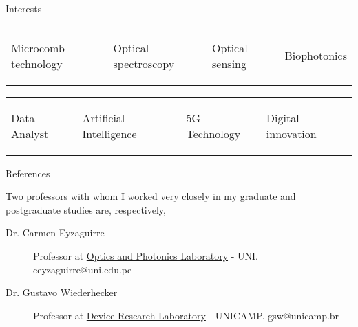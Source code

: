 \documentclass[letterpaper, 11pt]{article}[leftmargin=*]
\renewcommand{\section}[2]{
  \colorbox{boxcol}{\color{secondary}\raggedbottom\normalsize{#1}{\hspace{2pt}#2}}
}
\newcommand{\resumeEntryStart}{\begin{itemize}[leftmargin=2.5mm]\itemsep8pt}
\newcommand{\resumeEntryEnd}{\end{itemize}}
\newcommand{\resumeEntryS}[2]{
  \item[]\small{
    \textbf{\color{primary}#1 }{ #2 }
  }
}
\newcommand{\fourthcol}[4]{
	\vspace{-0.3cm}
	\begin{tabularx}{\textwidth}{XXXX}
		{\small#1} & {\small#2} & {\small#3} & {\small#4}
	\end{tabularx}
}
\begin{document}
\section{\faThumbTack}{Interests}
\vspace{-0.6cm}
\resumeEntryStart
\footnotesize
\fourthcol{\resumeEntryS{}{\item \footnotesize Microcomb technology}}{\resumeEntryS{}{\item \footnotesize Optical spectroscopy}}{\resumeEntryS{}{\item \footnotesize Optical sensing}}{\resumeEntryS{}{\item \footnotesize Biophotonics}}
\vspace{-0.7cm}
\fourthcol{\resumeEntryS{}{\item \footnotesize Data Analyst}}{\resumeEntryS{}{\item \footnotesize Artificial Intelligence}}{\resumeEntryS{}{\item \footnotesize 5G Technology}}{\resumeEntryS{}{\item \footnotesize Digital innovation}}
\resumeEntryEnd

\section{\faTripadvisor}{References}

\footnotesize
\vspace{4pt}
Two professors with whom I worked very closely in my graduate and postgraduate studies are, respectively,
\begin{description}
	\item[Dr. Carmen Eyzaguirre] Professor at \href{https://fc.uni.edu.pe/fc/index.php/noticias-secundarias/item/12-eyzaguirre-gorvenia-carmen}{Optics and Photonics Laboratory} - UNI. \href{ceyzaguirre@uni.edu.pe}{\faEnvelopeO} ceyzaguirre@uni.edu.pe
	\vspace{-0.05cm}
	\item[Dr. Gustavo Wiederhecker] Professor at \href{https://sites.ifi.unicamp.br/lpd/}{Device Research Laboratory} - UNICAMP. \href{gsw@unicamp.br}{\faEnvelopeO} gsw@unicamp.br
\end{description}
\end{document}
